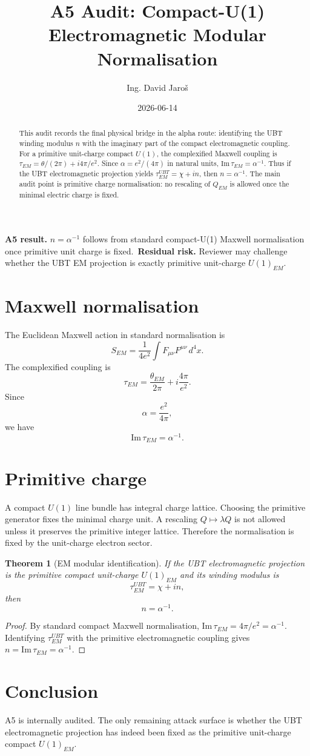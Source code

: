 \documentclass[12pt,a4paper]{article}
\title{A5 Audit: Compact-U(1) Electromagnetic Modular Normalisation}
\author{Ing. David Jaroš}
\date{2026-06-14}
\newtheorem{theorem}{Theorem}[section]
\begin{document}
\maketitle
\begin{abstract}
This audit records the final physical bridge in the alpha route: identifying the UBT winding modulus $n$ with the imaginary part of the compact electromagnetic coupling.  For a primitive unit-charge compact $U(1)$, the complexified Maxwell coupling is $\tau_{EM}=\theta/(2\pi)+i4\pi/e^2$.  Since $\alpha=e^2/(4\pi)$ in natural units, $\mathrm{Im}\,\tau_{EM}=\alpha^{-1}$.  Thus if the UBT electromagnetic projection yields $\tau^{UBT}_{EM}=\chi+in$, then $n=\alpha^{-1}$.  The main audit point is primitive charge normalisation: no rescaling of $Q_{EM}$ is allowed once the minimal electric charge is fixed.
\end{abstract}
\begin{statusbox}
\textbf{A5 result.} $n=\alpha^{-1}$ follows from standard compact-U(1) Maxwell normalisation once primitive unit charge is fixed.\
\textbf{Residual risk.} Reviewer may challenge whether the UBT EM projection is exactly primitive unit-charge $U(1)_{EM}$.
\end{statusbox}
\section{Maxwell normalisation}
The Euclidean Maxwell action in standard normalisation is
\[
  S_{EM}=\frac{1}{4e^2}\int F_{\mu\nu}F^{\mu\nu}\,d^4x.
\]
The complexified coupling is
\[
  \tau_{EM}=\frac{\theta_{EM}}{2\pi}+i\frac{4\pi}{e^2}.
\]
Since
\[
  \alpha=\frac{e^2}{4\pi},
\]
we have
\[
  \mathrm{Im}\,\tau_{EM}=\alpha^{-1}.
\]
\section{Primitive charge}
A compact $U(1)$ line bundle has integral charge lattice.  Choosing the primitive generator fixes the minimal charge unit.  A rescaling $Q\mapsto \lambda Q$ is not allowed unless it preserves the primitive integer lattice.  Therefore the normalisation is fixed by the unit-charge electron sector.
\begin{theorem}[EM modular identification]
If the UBT electromagnetic projection is the primitive compact unit-charge $U(1)_{EM}$ and its winding modulus is
\[
  \tau^{UBT}_{EM}=\chi+in,
\]
then
\[
  n=\alpha^{-1}.
\]
\end{theorem}
\begin{proof}
By standard compact Maxwell normalisation, $\mathrm{Im}\,\tau_{EM}=4\pi/e^2=\alpha^{-1}$.  Identifying $\tau^{UBT}_{EM}$ with the primitive electromagnetic coupling gives $n=\mathrm{Im}\,\tau_{EM}=\alpha^{-1}$.
\end{proof}
\section{Conclusion}
A5 is internally audited.  The only remaining attack surface is whether the UBT electromagnetic projection has indeed been fixed as the primitive unit-charge compact $U(1)_{EM}$.
\end{document}
